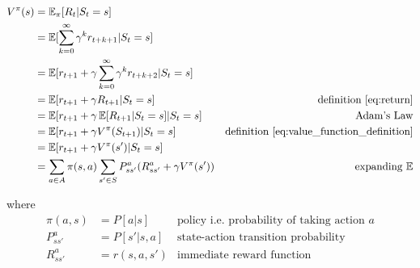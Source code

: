 \begin{align}
    V^{\pi}(s) &= \operatorname{\mathbb{E}}_{\pi}[R_{t} | S_t = s]  \label{eq:value_function_definition} \\
    &= \operatorname{\mathbb{E}}[\sum^{\infty}_{k=0} \gamma^k r_{t+k+1} | S_t = s] \nonumber \\
    &= \operatorname{\mathbb{E}}[r_{t+1} + \gamma \sum^{\infty}_{k=0} \gamma^k r_{t+k+2} | S_t = s] \nonumber \\
    &= \operatorname{\mathbb{E}}[r_{t+1} + \gamma R_{t+1} | S_t = s] & \text{definition \ref{eq:return}} \nonumber \\
    &= \operatorname{\mathbb{E}}[r_{t+1} + \gamma \operatorname{\mathbb{E}}[R_{t+1} | S_t = s] | S_t = s] & \text{Adam's Law} \nonumber \\
    &= \operatorname{\mathbb{E}}[r_{t+1} + \gamma V^{\pi}(S_{t+1}) | S_t = s] & \text{definition \ref{eq:value_function_definition}} \nonumber \\
    &= \operatorname{\mathbb{E}}[r_{t+1} + \gamma V^{\pi}(s') | S_t = s] \nonumber \\
    &= \sum_{a \in A} \pi(s, a) \sum_{s' \in S} P^{a}_{ss'} (R^{a}_{ss'} + \gamma V^{\pi}(s')) &\text{expanding $\operatorname{\mathbb{E}}$} \label{eq:mdp_value_function_expansion}
    \label{eq:value_function_def}
\end{align}

where 
\begin{align*}
    \pi(a, s) &= P[a|s] &\text{policy i.e. probability of taking action $a$}\\
    P^{a}_{ss'} &= P[s' | s, a] &\text{state-action transition probability}\\
    R^{a}_{ss'} &= r(s, a, s') &\text{immediate reward function}
\end{align*}




